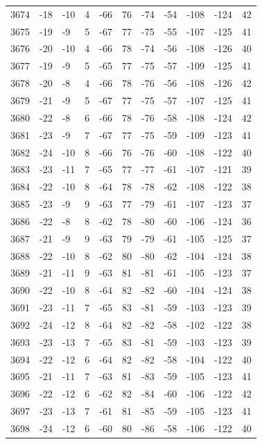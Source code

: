 \begin{table}[H]
\begin{tabular}{lllllllllll}
3674 & -18 & -10 & 4 & -66 & 76 & -74 & -54 & -108 & -124 & 42 \\
3675 & -19 & -9 & 5 & -67 & 77 & -75 & -55 & -107 & -125 & 41 \\
3676 & -20 & -10 & 4 & -66 & 78 & -74 & -56 & -108 & -126 & 40 \\
3677 & -19 & -9 & 5 & -65 & 77 & -75 & -57 & -109 & -125 & 41 \\
3678 & -20 & -8 & 4 & -66 & 78 & -76 & -56 & -108 & -126 & 42 \\
3679 & -21 & -9 & 5 & -67 & 77 & -75 & -57 & -107 & -125 & 41 \\
3680 & -22 & -8 & 6 & -66 & 78 & -76 & -58 & -108 & -124 & 42 \\
3681 & -23 & -9 & 7 & -67 & 77 & -75 & -59 & -109 & -123 & 41 \\
3682 & -24 & -10 & 8 & -66 & 76 & -76 & -60 & -108 & -122 & 40 \\
3683 & -23 & -11 & 7 & -65 & 77 & -77 & -61 & -107 & -121 & 39 \\
3684 & -22 & -10 & 8 & -64 & 78 & -78 & -62 & -108 & -122 & 38 \\
3685 & -23 & -9 & 9 & -63 & 77 & -79 & -61 & -107 & -123 & 37 \\
3686 & -22 & -8 & 8 & -62 & 78 & -80 & -60 & -106 & -124 & 36 \\
3687 & -21 & -9 & 9 & -63 & 79 & -79 & -61 & -105 & -125 & 37 \\
3688 & -22 & -10 & 8 & -62 & 80 & -80 & -62 & -104 & -124 & 38 \\
3689 & -21 & -11 & 9 & -63 & 81 & -81 & -61 & -105 & -123 & 37 \\
3690 & -22 & -10 & 8 & -64 & 82 & -82 & -60 & -104 & -124 & 38 \\
3691 & -23 & -11 & 7 & -65 & 83 & -81 & -59 & -103 & -123 & 39 \\
3692 & -24 & -12 & 8 & -64 & 82 & -82 & -58 & -102 & -122 & 38 \\
3693 & -23 & -13 & 7 & -65 & 83 & -81 & -59 & -103 & -123 & 39 \\
3694 & -22 & -12 & 6 & -64 & 82 & -82 & -58 & -104 & -122 & 40 \\
3695 & -21 & -11 & 7 & -63 & 81 & -83 & -59 & -105 & -123 & 41 \\
3696 & -22 & -12 & 6 & -62 & 82 & -84 & -60 & -106 & -122 & 42 \\
3697 & -23 & -13 & 7 & -61 & 81 & -85 & -59 & -105 & -123 & 41 \\
3698 & -24 & -12 & 6 & -60 & 80 & -86 & -58 & -106 & -122 & 40 \\

\end{tabular}
\end{table}

